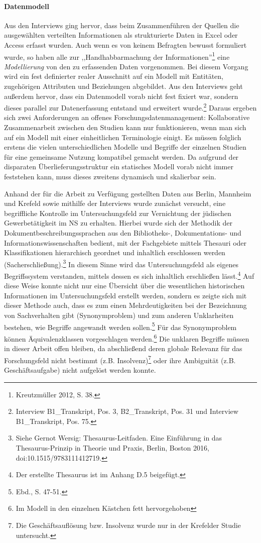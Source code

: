 \paragraph{Datenmodell} Aus den Interviews ging hervor, dass beim Zusammenführen der Quellen die ausgewählten verteilten Informationen als strukturierte Daten in Excel oder Access erfasst wurden. Auch wenn es von keinem Befragten bewusst formuliert wurde, so haben alle zur ,,Handhabbarmachung der Informationen''\footnote{Kreutzmüller 2012, S. 38.} eine \textit{Modellierung} von den zu erfassenden Daten vorgenommen. Bei diesem Vorgang wird ein fest definierter realer Ausschnitt auf ein Modell mit Entitäten, zugehörigen Attributen und Beziehungen abgebildet. Aus den Interviews geht außerdem hervor, dass ein Datenmodell vorab nicht fest fixiert war, sondern dieses parallel zur Datenerfassung entstand und erweitert wurde.\footnote{Interview B1\_Transkript, Pos. 3, B2\_Transkript, Pos. 31 und Interview B1\_Transkript, Pos. 75.} Daraus ergeben sich zwei Anforderungen an offenes Forschungsdatenmanagement: Kollaborative Zusammenarbeit zwischen den Studien kann nur funktionieren, wenn man sich auf ein Modell mit einer einheitlichen Terminologie einigt. Es müssen folglich erstens die vielen unterschiedlichen Modelle und Begriffe der einzelnen Studien für eine gemeinsame Nutzung kompatibel gemacht werden. Da aufgrund der disparaten Überlieferungsstruktur ein statisches Modell vorab nicht immer feststehen kann, muss dieses zweitens dynamisch und skalierbar sein.

Anhand der für die Arbeit zu Verfügung gestellten Daten aus Berlin, Mannheim und Krefeld sowie mithilfe der Interviews wurde zunächst versucht, eine begriffliche Kontrolle im Untersuchungsfeld zur Vernichtung der jüdischen Gewerbetätigkeit im NS zu erhalten. Hierbei wurde sich der Methodik der Dokumentbeschreibungssprachen aus den Bibliotheks-, Dokumentations- und Informationswissenschaften bedient, mit der Fachgebiete mittels Thesauri oder Klassifikationen hierarchisch geordnet und inhaltlich erschlossen werden (Sacherschließung).\footnote{Siehe Gernot Wersig: Thesaurus-Leitfaden. Eine Einführung in das Thesaurus-Prinzip in Theorie und Praxis, Berlin, Boston 2016, doi:10.1515/9783111412719.} In diesem Sinne wird das Untersuchungsfeld als eigenes Begriffssystem verstanden, mittels dessen es sich inhaltlich erschließen lässt.\footnote{Der erstellte Thesaurus ist im Anhang D.5 beigefügt.} Auf diese Weise konnte nicht nur eine Übersicht über die wesentlichen historischen Informationen im Untersuchungsfeld erstellt werden, sondern es zeigte sich mit dieser Methode auch, dass es zum einen Mehrdeutigkeiten bei der Bezeichnung von Sachverhalten gibt (Synonymproblem) und zum anderen Unklarheiten bestehen, wie Begriffe angewandt werden sollen.\footnote{Ebd., S. 47-51.} Für das Synonymproblem können Äquivalenzklassen vorgeschlagen werden.\footnote{Im Modell in den einzelnen Kästchen fett hervorgehoben} Die unklaren Begriffe müssen in dieser Arbeit offen bleiben, da abschließend deren globale Relevanz für das Forschungsfeld nicht bestimmt (z.B. Insolvenz)\footnote{Die Geschäftsauflösung bzw. Insolvenz wurde nur in der Krefelder Studie untersucht.} oder ihre Ambiguität (z.B. Geschäftsaufgabe) nicht aufgelöst werden konnte. 

